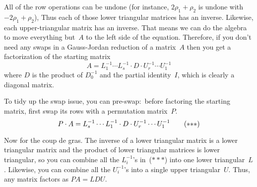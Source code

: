 All of the row operations can be undone
(for instance, $2\rho_1+\rho_2$
is undone with $-2\rho_1+\rho_2$), 
Thus each of those lower triangular matrices
has an inverse.
Likewise, each upper-triangular matrix has an inverse.
That means we can do the algebra to move everything but~$A$ 
to the left side of the equation.
Therefore, 
if you don't need any swaps in a Gauss-Jordan reduction of a matrix~$A$ 
then you get a factorization of the starting matrix
\begin{equation*} 
  A = L_1^{-1}\cdots L_s^{-1}\cdot D\cdot U_r^{-1}\cdots U_1^{-1}
\end{equation*}
where $D$ is the product of $D_0^{-1}$ and the partial identity~$I$, 
which is clearly a diagonal matrix.

To tidy up the swap issue, you can pre-swap:~before 
factoring the starting matrix, first swap its rows
with a permutation matrix~$P$.
\begin{equation*}
  P\cdot A = L_s^{-1}\cdots L_1^{-1}\cdot D\cdot U_r^{-1}\cdots U_1^{-1}
  \tag{$*{*}*$}
\end{equation*}

Now for the coup de gras.
The inverse of a lower triangular matrix is a lower triangular matrix
and the product of lower triangular matrices is 
lower triangular, so you can combine all the $L_i^{-1}$'s in~($*{*}*$) 
into one lower triangular~$L$.
Likewise, you can combine all the $U_i^{-1}$'s into a single 
upper triangular~$U$.
Thus, any matrix factors as $PA=LDU$.

